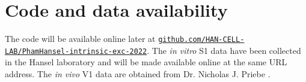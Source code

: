 \section{Code and data availability}

The code will be available online later at
    \href{https://github.com/HAN-CELL-LAB/PhamHansel-intrinsic-exc-2022}{\texttt{github.com/HAN-CELL-LAB/PhamHansel-intrinsic-exc-2022}}.
    The \textit{in vitro} S1 data have been collected in the Hansel laboratory \citep{Gill2020-wy}
        and will be made available online at the same URL address.
    The \textit{in vivo} V1 data are obtained from Dr. Nicholas J. Priebe \citep{Li2020-ej}.